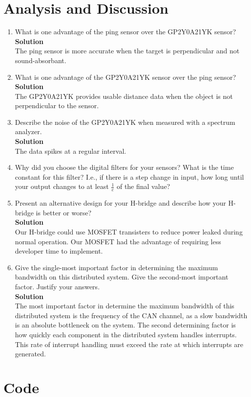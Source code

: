 \documentclass[12pt]{article}
\renewcommand{\Solnlabel}[1]{\textbf{Solution}\quad}
\begin{document}
\section{Analysis and Discussion}

\begin{enumerate}[1)]
\item What is one advantage of the ping sensor over the GP2Y0A21YK
  sensor? \\ \Solnlabel \newline \\
  The ping sensor is more accurate when the target is perpendicular
  and not sound-absorbant.
\item What is one advantage of the GP2Y0A21YK sensor over the ping
  sensor? \\ \Solnlabel \newline \\
  The GP2Y0A21YK provides usable distance data when the object is not
  perpendicular to the sensor.
\item Describe the noise of the GP2Y0A21YK when measured with a
  spectrum analyzer. \\ \Solnlabel \newline \\
  The data spikes at a regular interval.
\item Why did you choose the digital filters for your sensors? What is
  the time constant for this filter? I.e., if there is a step change
  in input, how long until your output changes to at least $\frac{1}{e}$ of the
  final value? \\ %
\item Present an alternative design for your H-bridge and describe how
  your H-bridge is better or worse? \\ \Solnlabel \newline \\
  Our H-bridge could use MOSFET transisters to reduce power leaked
  during normal operation. Our MOSFET had the advantage of requiring
  less developer time to implement.
\item Give the single-most important factor in determining the maximum
  bandwidth on this distributed system.  Give the second-most
  important factor. Justify your answers. \\ \Solnlabel \newline \\
  The most important factor in determine the maximum bandwidth of this
  distributed system is the frequency of the CAN channel, as a slow
  bandwidth is an absolute bottleneck on the system. The second
  determining factor is how quickly each component in the distributed
  system handles interrupts. This rate of interrupt handling must
  exceed the rate at which interrupts are generated.
\end{enumerate}

\newpage
\section{Code}

\end{document}
